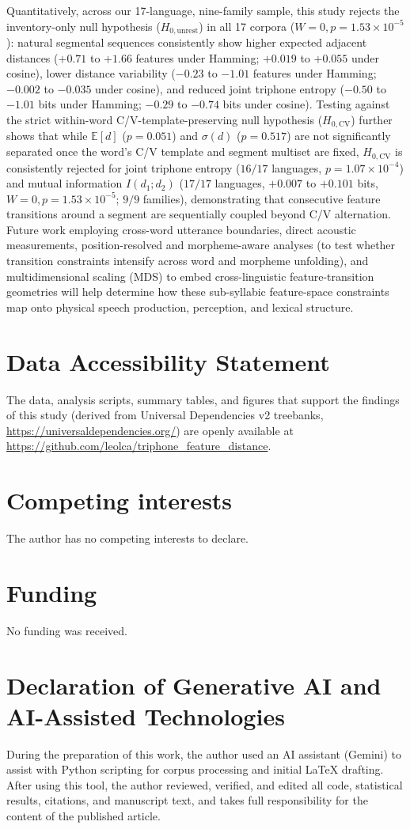 \documentclass[11pt,a4paper,leqno]{article}
\begin{document}
Quantitatively, across our 17-language, nine-family sample, this study rejects the inventory-only null hypothesis ($H_{0,\text{unrest}}$) in all 17 corpora ($W=0, p=1.53 \times 10^{-5}$): natural segmental sequences consistently show higher expected adjacent distances ($+0.71$ to $+1.66$ features under Hamming; $+0.019$ to $+0.055$ under cosine), lower distance variability ($-0.23$ to $-1.01$ features under Hamming; $-0.002$ to $-0.035$ under cosine), and reduced joint triphone entropy ($-0.50$ to $-1.01$ bits under Hamming; $-0.29$ to $-0.74$ bits under cosine). Testing against the strict within-word C/V-template-preserving null hypothesis ($H_{0,\text{CV}}$) further shows that while $\mathbb{E}[d]$ ($p=0.051$) and $\sigma(d)$ ($p=0.517$) are not significantly separated once the word's C/V template and segment multiset are fixed, $H_{0,\text{CV}}$ is consistently rejected for joint triphone entropy ($16/17$ languages, $p=1.07 \times 10^{-4}$) and mutual information $I(d_1; d_2)$ ($17/17$ languages, $+0.007$ to $+0.101$ bits, $W=0, p=1.53 \times 10^{-5}$; $9/9$ families), demonstrating that consecutive feature transitions around a segment are sequentially coupled beyond C/V alternation. Future work employing cross-word utterance boundaries, direct acoustic measurements, position-resolved and morpheme-aware analyses (to test whether transition constraints intensify across word and morpheme unfolding), and multidimensional scaling (MDS) to embed cross-linguistic feature-transition geometries will help determine how these sub-syllabic feature-space constraints map onto physical speech production, perception, and lexical structure.

\section*{Data Accessibility Statement}
The data, analysis scripts, summary tables, and figures that support the findings of this study (derived from Universal Dependencies v2 treebanks, \url{https://universaldependencies.org/}) are openly available at \url{https://github.com/leolca/triphone_feature_distance}.

\section*{Competing interests}
The author has no competing interests to declare.

\section*{Funding}
No funding was received.

\section*{Declaration of Generative AI and AI-Assisted Technologies}
During the preparation of this work, the author used an AI assistant (Gemini) to assist with Python scripting for corpus processing and initial LaTeX drafting. After using this tool, the author reviewed, verified, and edited all code, statistical results, citations, and manuscript text, and takes full responsibility for the content of the published article.

\printbibliography
\end{document}
